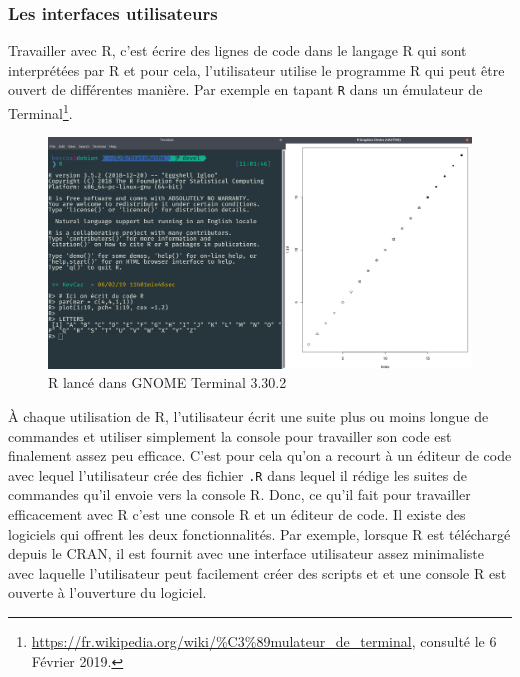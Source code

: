 \documentclass[]{article}
\begin{document}
\hypertarget{les-interfaces-utilisateurs}{%
\subsubsection{Les interfaces utilisateurs}\label{les-interfaces-utilisateurs}}

Travailler avec R, c'est écrire des lignes de code dans le langage R qui sont interprétées par R et pour cela, l'utilisateur utilise le programme R qui peut être ouvert de différentes manière. Par exemple en tapant \texttt{R} dans un émulateur de Terminal\footnote{\url{https://fr.wikipedia.org/wiki/\%C3\%89mulateur_de_terminal}, consulté le 6 Février 2019.}.

\begin{figure}
\centering
\includegraphics{img/chap2/terminal.png}
\caption{R lancé dans GNOME Terminal 3.30.2}
\end{figure}

À chaque utilisation de R, l'utilisateur écrit une suite plus ou moins longue de commandes et utiliser simplement la console pour travailler son code est finalement assez peu efficace. C'est pour cela qu'on a recourt à un éditeur de code avec lequel l'utilisateur crée des fichier \texttt{.R} dans lequel il rédige les suites de commandes qu'il envoie vers la console R. Donc, ce qu'il fait pour travailler efficacement avec R c'est une console R et un éditeur de code. Il existe des logiciels qui offrent les deux fonctionnalités. Par exemple, lorsque R est téléchargé depuis le CRAN, il est fournit avec une interface utilisateur assez minimaliste avec laquelle l'utilisateur peut facilement créer des scripts et et une console R est ouverte à l'ouverture du logiciel.
\end{document}
